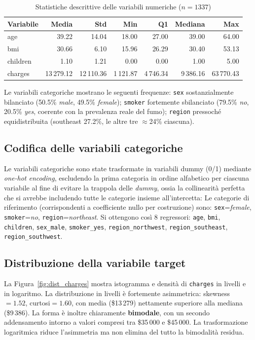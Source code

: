 \documentclass[11pt,a4paper]{article}
\begin{document}
\begin{table}[H]
\centering
\caption{Statistiche descrittive delle variabili numeriche ($n=1337$)}
\label{tab:descrittive}
\begin{tabular}{lrrrrrr}
\toprule
Variabile & Media & Std & Min & Q1 & Mediana & Max \\
\midrule
age      & 39.22 & 14.04 & 18.00 & 27.00 & 39.00 & 64.00 \\
bmi      & 30.66 & 6.10  & 15.96 & 26.29 & 30.40 & 53.13 \\
children & 1.10  & 1.21  & 0.00  & 0.00  & 1.00  & 5.00 \\
charges  & 13\,279.12 & 12\,110.36 & 1\,121.87 & 4\,746.34 & 9\,386.16 & 63\,770.43 \\
\bottomrule
\end{tabular}
\end{table}

Le variabili categoriche mostrano le seguenti frequenze: \texttt{sex}
sostanzialmente bilanciato (50.5\% \emph{male}, 49.5\% \emph{female});
\texttt{smoker} fortemente sbilanciato (79.5\% \emph{no}, 20.5\% \emph{yes},
coerente con la prevalenza reale del fumo); \texttt{region}
pressoché equidistribuita (southeast 27.2\%, le altre tre $\approx$24\%
ciascuna).

\subsection{Codifica delle variabili categoriche}
Le variabili categoriche sono state trasformate in variabili dummy (0/1)
mediante \emph{one-hot encoding}, escludendo la prima categoria in ordine
alfabetico per ciascuna variabile al fine di
evitare la trappola delle \emph{dummy}, ossia la collinearità perfetta che si
avrebbe includendo tutte le categorie insieme all'intercetta:
Le categorie di riferimento (corrispondenti a coefficiente nullo
per costruzione) sono: \texttt{sex}=\emph{female}, \texttt{smoker}=\emph{no},
\texttt{region}=\emph{northeast}. Si ottengono così 8 regressori:
\texttt{age}, \texttt{bmi}, \texttt{children}, \texttt{sex\_male},
\texttt{smoker\_yes}, \texttt{region\_northwest}, \texttt{region\_southeast},
\texttt{region\_southwest}.

\subsection{Distribuzione della variabile target}
La Figura~\ref{fig:dist_charges} mostra istogramma e densità di
\texttt{charges} in livelli e in logaritmo. La distribuzione in livelli è
fortemente asimmetrica: skewness $=1.52$, curtosi$=1.60$, con media (\$13\,279) nettamente
superiore alla mediana (\$9\,386). La forma è inoltre chiaramente
\textbf{bimodale}, con un secondo addensamento intorno a valori compresi tra \$35\,000 e \$45\,000.
La trasformazione logaritmica riduce l'asimmetria ma non elimina del tutto
la bimodalità residua.
\end{document}
